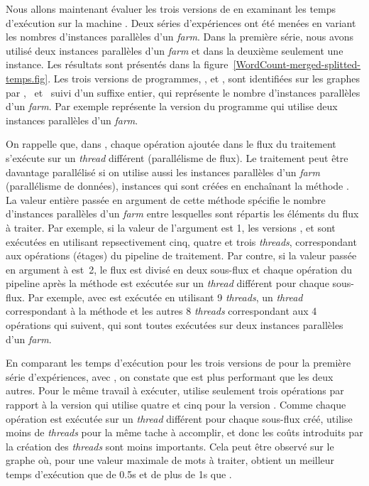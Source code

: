 Nous allons maintenant \'evaluer les trois versions de  en examinant les temps d'ex\'ecution sur la machine . Deux s\'eries d'exp\'eriences ont \'et\'e men\'ees en variant les nombres d'instances parall\`eles d'un \emph{farm}. Dans la premi\`ere s\'erie, nous avons utilis\'e deux instances parall\`eles d'un \emph{farm} et dans la deuxi\`eme seulement une instance.  Les r\'esultats sont présentés dans la figure~\ref{WordCount-merged-splitted-temps.fig}. Les trois versions de programmes, ,  et , sont identifiées sur les graphes par \ppffs, \ppff\ et \ppfff\ suivi d'un suffixe entier, qui repr\'esente le nombre d'instances parall\`eles d'un \emph{farm}. Par exemple \ppffs{} repr\'esente la version du programme  qui utilise deux instances parall\`eles d'un \emph{farm}.

On rappelle que, dans , chaque op\'eration ajout\'ee dans le flux du traitement s'ex\'ecute sur un \emph{thread} diff\'erent (parallélisme de flux). Le traitement peut \^etre davantage parall\'elis\'e si on utilise aussi les instances parall\`eles d'un \emph{farm} (parallélisme de données), instances qui sont cr\'e\'ees en encha\^inant la m\'ethode . La valeur enti\`ere pass\'ee en argument de cette m\'ethode sp\'ecifie le nombre d'instances parall\`eles d'un \emph{farm} entre lesquelles sont r\'epartis les \'el\'ements du flux \`a traiter. Par exemple, si la valeur de l'argument est 1, les versions ,  et  sont ex\'ecut\'ees en utilisant repsectivement cinq, quatre et trois \emph{threads}, correspondant aux op\'erations (étages) du pipeline de traitement. Par contre, si la valeur pass\'ee en argument \`a   est~2, le flux est divis\'e en deux sous-flux et chaque op\'eration du pipeline après la m\'ethode  est ex\'ecut\'ee sur un \emph{thread} diff\'erent pour chaque sous-flux. Par exemple,  avec  est ex\'ecut\'ee en utilisant 9 \emph{threads}, un \emph{thread} correspondant \`a la m\'ethode  et les autres 8 \emph{threads} correspondant aux 4 op\'erations qui suivent, qui sont toutes ex\'ecut\'ees sur deux instances parall\`eles d'un \emph{farm}.

En comparant les temps d'ex\'ecution pour les trois versions de  pour la premi\`ere s\'erie d'exp\'eriences, avec , on constate que  est plus performant que les deux autres. Pour le m\^eme travail \`a ex\'ecuter,  utilise seulement trois op\'erations par rapport \`a la version  qui utilise quatre et cinq pour la version . Comme chaque op\'eration est ex\'ecut\'ee sur un \emph{thread} diff\'erent pour chaque sous-flux cr\'e\'e,  utilise moins de \emph{threads} pour la m\^eme tache \`a accomplir, et donc les co\^uts introduits par la cr\'eation des \emph{threads} sont moins importants. Cela peut \^etre observ\'e sur le graphe o\`u, pour une valeur maximale de mots \`a traiter,  obtient un meilleur temps d'ex\'ecution que  de 0.5s et de plus de 1s que . 


